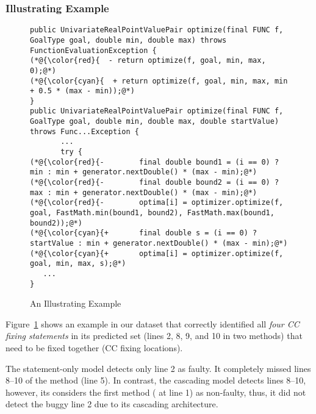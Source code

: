 \subsubsection{{\bf Illustrating Example}}
\label{sec:example}

\begin{figure}[t]
	\centering
	\begin{lstlisting}[]
public UnivariateRealPointValuePair optimize(final FUNC f, GoalType goal, double min, double max) throws FunctionEvaluationException {
(*@{\color{red}{  - return optimize(f, goal, min, max, 0);@*)
(*@{\color{cyan}{  + return optimize(f, goal, min, max, min + 0.5 * (max - min));@*)
}
public UnivariateRealPointValuePair optimize(final FUNC f, GoalType goal, double min, double max, double startValue) throws Func...Exception {
       ...
       try {
(*@{\color{red}{-        final double bound1 = (i == 0) ? min : min + generator.nextDouble() * (max - min);@*)
(*@{\color{red}{-        final double bound2 = (i == 0) ? max : min + generator.nextDouble() * (max - min);@*)
(*@{\color{red}{-        optima[i] = optimizer.optimize(f, goal, FastMath.min(bound1, bound2), FastMath.max(bound1, bound2));@*)
(*@{\color{cyan}{+       final double s = (i == 0) ? startValue : min + generator.nextDouble() * (max - min);@*)
(*@{\color{cyan}{+       optima[i] = optimizer.optimize(f, goal, min, max, s);@*)
   ...
}
\end{lstlisting}
        \vspace{-15pt}
	\caption{An Illustrating Example}
	\label{example}
\end{figure}

Figure~\ref{example} shows an example in our dataset that {\tool}
correctly identified all {\em four CC fixing statements} in its predicted
set (lines 2, 8, 9, and 10 in two methods) that need to be fixed
together (CC fixing locations).

The statement-only model detects only line 2 as faulty. It completely
missed lines 8--10 of the  method (line 5). In contrast,
the cascading model detects lines 8--10, however, its 
considers the first method ( at line 1) as
non-faulty, thus, it did not detect the buggy line 2 due
to its cascading architecture.

